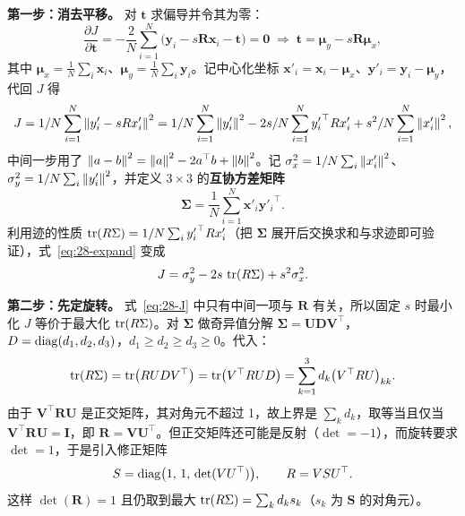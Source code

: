 \textbf{第一步：消去平移。} 对 $\bm{t}$ 求偏导并令其为零：
\begin{equation}
\frac{\partial J}{\partial\bm{t}}=-\frac{2}{N}\sum_{i=1}^{N}\bigl(\bm{y}_i-s\bm{R}\bm{x}_i-\bm{t}\bigr)=\bm{0}
\;\Longrightarrow\;
\bm{t}=\bm{\mu}_y-s\bm{R}\bm{\mu}_x,
\label{eq:28-t}
\end{equation}
其中 $\bm{\mu}_x=\frac{1}{N}\sum_i\bm{x}_i$、$\bm{\mu}_y=\frac{1}{N}\sum_i\bm{y}_i$。记中心化坐标 $\bm{x}'_i=\bm{x}_i-\bm{\mu}_x$、$\bm{y}'_i=\bm{y}_i-\bm{\mu}_y$，代回 $J$ 得
\begin{equation}
J=1/N\sum_{i=1}^{N}\left\lVert y'_i-sRx'_i \right\rVert^{2}
=1/N\sum_{i=1}^{N}\left\lVert y'_i \right\rVert^{2}-2s/N\sum_{i=1}^{N}{y'_i}^{\top}Rx'_i+s^{2}/N\sum_{i=1}^{N}\left\lVert x'_i \right\rVert^{2},
\label{eq:28-expand}
\end{equation}
中间一步用了 $\left\lVert a-b \right\rVert^2=\left\lVert a \right\rVert^2-2a^{\top}b+\left\lVert b \right\rVert^2$。记 $\sigma_x^{2}=1/N\sum_i\left\lVert x'_i \right\rVert^{2}$、$\sigma_y^{2}=1/N\sum_i\left\lVert y'_i \right\rVert^{2}$，并定义 $3\times3$ 的\textbf{互协方差矩阵}
\begin{equation}
\bm{\Sigma}=\frac{1}{N}\sum_{i=1}^{N}\bm{x}'_i{\bm{y}'_i}^{\top}.
\label{eq:28-sigma}
\end{equation}
利用迹的性质 $\operatorname{tr}(R\Sigma)=1/N\sum_i{y'_i}^{\top}Rx'_i$（把 $\bm{\Sigma}$ 展开后交换求和与求迹即可验证），式~\eqref{eq:28-expand} 变成
\begin{equation}
J=\sigma_y^{2}-2s\,\operatorname{tr}(R\Sigma)+s^{2}\sigma_x^{2}.
\label{eq:28-J}
\end{equation}

\textbf{第二步：先定旋转。} 式~\eqref{eq:28-J} 中只有中间一项与 $\bm{R}$ 有关，所以固定 $s$ 时最小化 $J$ 等价于最大化 $\operatorname{tr}(R\Sigma)$。对 $\bm{\Sigma}$ 做奇异值分解 $\bm{\Sigma}=\bm{U}\bm{D}\bm{V}^{\top}$，$D=\operatorname{diag}(d_1,d_2,d_3)$，$d_1\ge d_2\ge d_3\ge0$。代入：
\begin{equation}
\operatorname{tr}(R\Sigma)=\operatorname{tr}\bigl(RUDV^{\top}\bigr)=\operatorname{tr}\bigl(V^{\top}RUD\bigr)=\sum_{k=1}^{3}d_k\bigl(V^{\top}RU\bigr)_{kk}.
\end{equation}
由于 $\bm{V}^{\top}\bm{R}\bm{U}$ 是正交矩阵，其对角元不超过 1，故上界是 $\sum_k d_k$，取等当且仅当 $\bm{V}^{\top}\bm{R}\bm{U}=\bm{I}$，即 $\bm{R}=\bm{V}\bm{U}^{\top}$。但正交矩阵还可能是反射（$\det=-1$），而旋转要求 $\det=1$，于是引入修正矩阵
\begin{equation}
S=\operatorname{diag}\bigl(1,\,1,\,\det(VU^{\top})\bigr),\qquad
R=VSU^{\top}.
\label{eq:28-R}
\end{equation}
这样 $\det(\bm{R})=1$ 且仍取到最大 $\operatorname{tr}(R\Sigma)=\sum_k d_k s_k$（$s_k$ 为 $\bm{S}$ 的对角元）。

